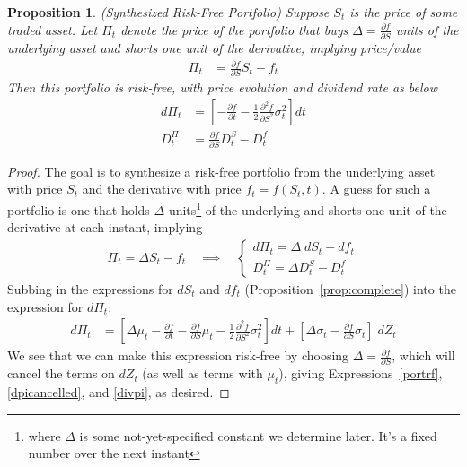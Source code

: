 \documentclass[12pt]{article}
\theoremstyle{plain}
\newtheorem{prop}[thm]{Proposition}
\theoremstyle{definition}
\theoremstyle{remark}
\begin{document}
\begin{prop}\emph{(Synthesized Risk-Free Portfolio)}
\label{prop:rf}
Suppose $S_t$ is the price of some traded asset.
Let $\Pi_t$ denote the price of the portfolio that buys
$\Delta=\frac{\partial f}{\partial S}$ units of the underlying asset
and shorts one unit of the derivative, implying price/value
\begin{align}
  \Pi_t &= \frac{\partial f}{\partial S} S_t - f_t
  \label{portrf}
\end{align}
Then this portfolio is risk-free, with price evolution and dividend rate
as below
\begin{align}
  d\Pi_t
  &=
  \left[
  -
  \frac{\partial f}{\partial t}
  -
  \frac{1}{2}
  \frac{\partial^2 f}{\partial S^2}
  \sigma^2_t
  \right]
  dt
  \label{dpicancelled}
  \\
  D_t^\Pi
  &=
  \frac{\partial f}{\partial S}
  D_t^S - D_t^f
  \label{divpi}
\end{align}
\end{prop}
\begin{proof}
The goal is to synthesize a risk-free portfolio from the underlying
asset with price $S_t$ and the derivative with price $f_t=f(S_t,t)$.
A guess for such a portfolio is one that holds $\Delta$ units\footnote{%
  where $\Delta$ is some not-yet-specified constant we determine
  later. It's a fixed number over the next instant
}
of the underlying and shorts one unit of the derivative at each instant,
implying
\begin{align}
  \Pi_t = \Delta S_t - f_t
  \quad \implies\quad
  \begin{cases}
    d\Pi_t = \Delta \; dS_t - df_t \\
    D_t^\Pi = \Delta D_t^S - D_t^f
  \end{cases}
  \label{dpi}
\end{align}
Subbing in the expressions for $dS_t$ and $df_t$
(Proposition~\ref{prop:complete}) into the expression for $d\Pi_t$:
\begin{align*}
  d\Pi_t
  &=
  \left[
  \Delta \mu_t
  -
  \frac{\partial f}{\partial t}
  -
  \frac{\partial f}{\partial S}
  \mu_t
  -
  \frac{1}{2}
  \frac{\partial^2 f}{\partial S^2}
  \sigma^2_t
  \right]
  dt
  +
  \left[
  \Delta \sigma_t
  - \frac{\partial f}{\partial S}
  \sigma_t
  \right]
  \;dZ_t
\end{align*}
We see that we can make this expression risk-free by choosing
$\Delta = \frac{\partial f}{\partial S}$, which will cancel the terms
on $dZ_t$ (as well as terms with $\mu_t$), giving
Expressions~\ref{portrf}, \ref{dpicancelled}, and \ref{divpi}, as
desired.
\end{proof}
\end{document}
